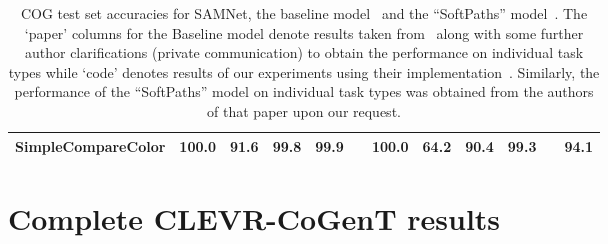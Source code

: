 \begin{table*}[htb]
\begin{adjustbox}{width=\columnwidth}
\begin{tabular}{l c c c c c c c c c c c}
			SimpleCompareColor    &    100.0    &    91.6    &    99.8    &    99.9    &    &    100.0    &    64.2    &    90.4    &    99.3    &   &    94.1    \\
			\bottomrule
		\end{tabular}
	\end{adjustbox}
	\caption{COG test set accuracies for SAMNet, the baseline model~\cite{yang2018dataset} and the ``SoftPaths'' model~\cite{haurilet2019s}. The `paper' columns for the Baseline model denote results taken from~\cite{yang2018dataset} along with some further author clarifications (private communication)  to obtain the performance on individual task types while `code' denotes results of our experiments using their implementation~\cite{yang2018implement}. Similarly, the performance of  the ``SoftPaths'' model on individual task types was obtained from the authors of that paper upon our request.} 
    \label{tab:all-results}
\end{table*}


\clearpage
\section{Complete CLEVR-CoGenT results}
\label{sec:full-cogent-results}

